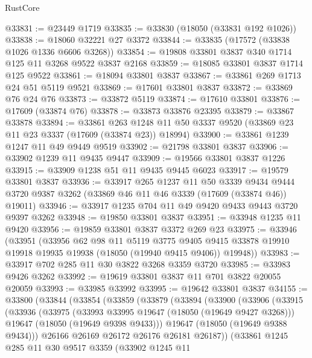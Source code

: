 \begin{lexlean}{RustCore}
\begin{coremodule}
@33831 := @23449 @1719
@33835 := @33830 (@18050 (@33831 @192 @1026))
@33838 := @18060 @32221 @27 @3372
@33844 := @33835 (@17572 (@33838 @1026 @1336 @6606 @3268))
@33854 := @19808 @33801 @3837 @340 @1714 @125 @11 @3268 @9522 @3837 @2168
@33859 := @18085 @33801 @3837 @1714 @125 @9522
@33861 := @18094 @33801 @3837
@33867 := @33861 @269 @1713 @24 @51 @5119 @9521
@33869 := @17601 @33801 @3837
@33872 := @33869 @76 @24 @76
@33873 := @33872 @5119
@33874 := @17610 @33801
@33876 := @17609 (@33874 @76)
@33878 := @33873 @33876 @23395
@33879 := @33867 @33878
@33894 := @33861
    @263
    @1248
    @11
    @50
    @3337
    @9520
    (@33869 @23 @11 @23 @3337 (@17609 (@33874 @23)) @18994)
@33900 := @33861 @1239 @1247 @11 @49 @9449 @9519
@33902 := @21798 @33801 @3837
@33906 := @33902 @1239 @11 @9435 @9447
@33909 := @19566 @33801 @3837 @1226
@33915 := @33909 @1238 @51 @11 @9435 @9445 @6023
@33917 := @19579 @33801 @3837
@33936 := @33917
    @265
    @1237
    @11
    @50
    @3339
    @9434
    @9444
    @3720
    @9387
    @3262
    (@33869 @46 @11 @46 @3339 (@17609 (@33874 @46)) @19011)
@33946 := @33917 @1235 @704 @11 @49 @9420 @9433 @9443 @3720 @9397 @3262
@33948 := @19850 @33801 @3837
@33951 := @33948 @1235 @11 @9420
@33956 := @19859 @33801 @3837 @3372 @269 @23
@33975 := @33946
    (@33951
      (@33956
        @62
        @98
        @11
        @5119
        @3775
        @9405
        @9415
        @33878
        @19910
        @19918
        @19935
        @19938
        (@18050 (@19940 @9415 @9406))
        @19948))
@33983 := @33917 @702 @285 @11 @30 @3822 @3268 @3359 @3720
@33985 := @33983 @9426 @3262
@33992 := @19619 @33801 @3837 @11 @701 @3822 @20055 @20059
@33993 := @33985 @33992
@33995 := @19642 @33801 @3837
@34155 := @33800
    (@33844
      (@33854
        (@33859
          (@33879
            (@33894
              (@33900
                (@33906
                  (@33915
                    (@33936
                      (@33975
                        (@33993 @33995 @19647 (@18050 (@19649 @9427 @3268)))
                        @19647
                        (@18050 (@19649 @9398 @9433)))
                      @19647
                      (@18050 (@19649 @9388 @9434)))
                    @26166
                    @26169
                    @26172
                    @26176
                    @26181
                    @26187))
                (@33861
                  @1245
                  @285
                  @11
                  @30
                  @9517
                  @3359
                  (@33902
                    @1245
                    @11

\end{coremodule}
\end{lexlean}
